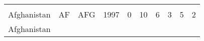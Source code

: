\documentclass[]{article}
\begin{document}
\begin{longtable}[]{@{}lllrrrrrrr@{}}
\begin{minipage}[t]{0.09\columnwidth}
\strut
\end{minipage} & \begin{minipage}[t]{0.09\columnwidth}\raggedleft\strut
\strut
\end{minipage} & \begin{minipage}[t]{0.09\columnwidth}\raggedleft\strut
\strut
\end{minipage} & \begin{minipage}[t]{0.09\columnwidth}\raggedleft\strut
\strut
\end{minipage} & \begin{minipage}[t]{0.09\columnwidth}\raggedleft\strut
\strut
\end{minipage}\tabularnewline
\begin{minipage}[t]{0.08\columnwidth}\raggedright\strut
Afghanistan\strut
\end{minipage} & \begin{minipage}[t]{0.04\columnwidth}\raggedright\strut
AF\strut
\end{minipage} & \begin{minipage}[t]{0.04\columnwidth}\raggedright\strut
AFG\strut
\end{minipage} & \begin{minipage}[t]{0.04\columnwidth}\raggedleft\strut
1997\strut
\end{minipage} & \begin{minipage}[t]{0.08\columnwidth}\raggedleft\strut
0\strut
\end{minipage} & \begin{minipage}[t]{0.09\columnwidth}\raggedleft\strut
10\strut
\end{minipage} & \begin{minipage}[t]{0.09\columnwidth}\raggedleft\strut
6\strut
\end{minipage} & \begin{minipage}[t]{0.09\columnwidth}\raggedleft\strut
3\strut
\end{minipage} & \begin{minipage}[t]{0.09\columnwidth}\raggedleft\strut
5\strut
\end{minipage} & \begin{minipage}[t]{0.09\columnwidth}\raggedleft\strut
2\strut
\end{minipage}\tabularnewline
\begin{minipage}[t]{0.08\columnwidth}\raggedright\strut
Afghanistan\strut
\end{minipage} & \begin{minipage}[t]{0.04\columnwidth}\raggedright\strut

\end{minipage}
\end{longtable}
\end{document}
